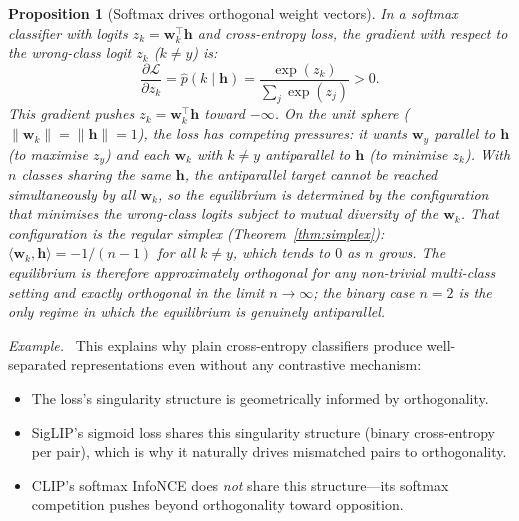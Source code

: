 \documentclass[11pt,a4paper]{article}
\newtheorem{proposition}[theorem]{Proposition}
\theoremstyle{remark}
\newenvironment{casestudy}{\par\medskip\noindent\textit{Example.}\ }{\par\medskip}
\begin{document}
\begin{proposition}[Softmax drives orthogonal weight vectors]
\label{prop:softmax-orthogonal}
In a softmax classifier with logits $z_k = \mathbf{w}_k^\top \mathbf{h}$ and cross-entropy loss, the gradient with respect to the wrong-class logit $z_k$ ($k \neq y$) is:
\begin{equation}
  \frac{\partial \mathcal{L}}{\partial z_k} = \hat{p}(k \mid \mathbf{h}) = \frac{\exp(z_k)}{\sum_j \exp(z_j)} > 0.
  \label{eq:ce-gradient}
\end{equation}
This gradient pushes $z_k = \mathbf{w}_k^\top \mathbf{h}$ toward $-\infty$.
On the unit sphere ($\|\mathbf{w}_k\| = \|\mathbf{h}\| = 1$), the loss has competing pressures: it wants $\mathbf{w}_y$ parallel to $\mathbf{h}$ (to maximise $z_y$) and each $\mathbf{w}_k$ with $k \neq y$ antiparallel to $\mathbf{h}$ (to minimise $z_k$).
With $n$ classes sharing the same $\mathbf{h}$, the antiparallel target cannot be reached simultaneously by all $\mathbf{w}_k$, so the equilibrium is determined by the configuration that minimises the wrong-class logits subject to mutual diversity of the $\mathbf{w}_k$.
That configuration is the regular simplex (Theorem~\ref{thm:simplex}): $\langle \mathbf{w}_k, \mathbf{h}\rangle = -1/(n-1)$ for all $k \neq y$, which tends to $0$ as $n$ grows.
The equilibrium is therefore \emph{approximately} orthogonal for any non-trivial multi-class setting and \emph{exactly} orthogonal in the limit $n \to \infty$; the binary case $n = 2$ is the only regime in which the equilibrium is genuinely antiparallel.
\end{proposition}

\begin{casestudy}
This explains why plain cross-entropy classifiers produce well-separated representations even without any contrastive mechanism:
\begin{itemize}
  \item The loss's singularity structure is geometrically informed by orthogonality.
  \item SigLIP's sigmoid loss shares this singularity structure (binary cross-entropy per pair), which is why it naturally drives mismatched pairs to orthogonality.
  \item CLIP's softmax InfoNCE does \emph{not} share this structure---its softmax competition pushes beyond orthogonality toward opposition.
\end{itemize}
\end{casestudy}


\end{document}
